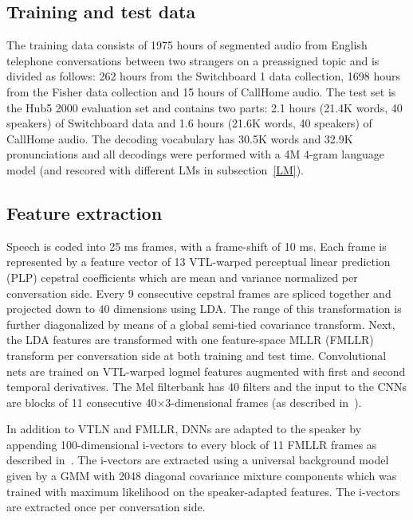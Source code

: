 \documentclass[a4paper]{article}
\begin{document}
\subsection{Training and test data}

The training data consists of 1975 hours of segmented audio from English telephone
conversations between two strangers on a preassigned topic and is
divided as follows: 262 hours from the Switchboard
1 data collection, 1698 hours from the Fisher data
collection and 15 hours of CallHome audio. The test set is
the Hub5 2000 evaluation set and contains two parts: 2.1 hours (21.4K
words, 40 speakers) of Switchboard data and 1.6 hours (21.6K words, 40
speakers) of CallHome audio. The decoding vocabulary has 30.5K words
and 32.9K pronunciations and all decodings were performed with a 4M
4-gram language model (and rescored with different LMs in
subsection~\ref{LM}).

\subsection{Feature extraction}

Speech is coded into 25 ms frames, with a frame-shift of 10 ms. Each
frame is represented by a feature vector of 13 VTL-warped perceptual
linear prediction (PLP) cepstral coefficients which are mean and
variance normalized per conversation side. Every 9 consecutive
cepstral frames are spliced together and projected down to 40
dimensions using LDA. The range of this transformation is further
diagonalized by means of a global semi-tied covariance
transform. Next, the LDA features are transformed with one
feature-space MLLR (FMLLR) transform per conversation side at both
training and test time. Convolutional nets are trained on VTL-warped
logmel features augmented with first and second temporal
derivatives. The Mel filterbank has 40 filters and the input to the
CNNs are blocks of 11 consecutive 40$\times$3-dimensional frames (as
described in~\cite{soltau14}).

In addition to VTLN and FMLLR, DNNs are adapted to the speaker by
appending 100-dimensional i-vectors to every block of 11 FMLLR frames
as described in~\cite{saon13}. The i-vectors are extracted using a
universal background model given by a GMM with 2048 diagonal
covariance mixture components which was trained with maximum
likelihood on the speaker-adapted features. The i-vectors are
extracted once per conversation side.
\end{document}
